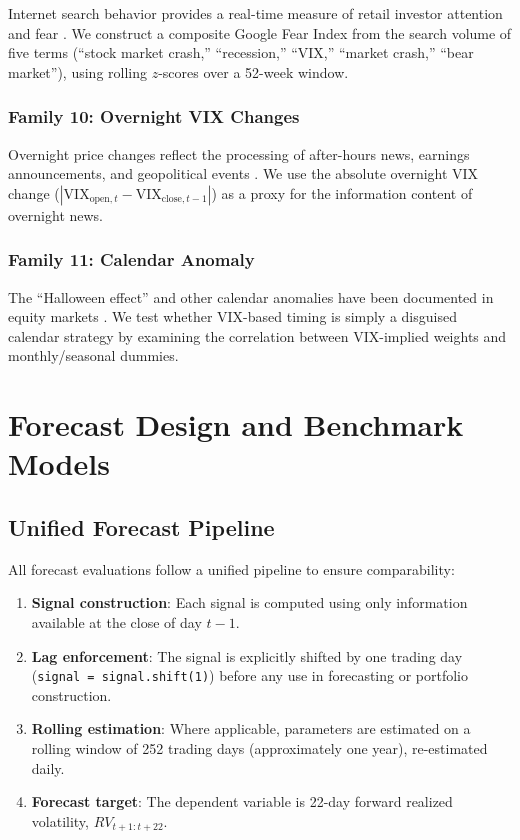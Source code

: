 \documentclass[12pt,a4paper]{article}
\begin{document}
Internet search behavior provides a real-time measure of retail investor attention and fear \citep{da2011, preis2013}. We construct a composite Google Fear Index from the search volume of five terms (``stock market crash,'' ``recession,'' ``VIX,'' ``market crash,'' ``bear market''), using rolling $z$-scores over a 52-week window.

\subsubsection{Family 10: Overnight VIX Changes}

Overnight price changes reflect the processing of after-hours news, earnings announcements, and geopolitical events \citep{lou2019}. We use the absolute overnight VIX change ($|\text{VIX}_{\text{open},t} - \text{VIX}_{\text{close},t-1}|$) as a proxy for the information content of overnight news.

\subsubsection{Family 11: Calendar Anomaly}

The ``Halloween effect'' and other calendar anomalies have been documented in equity markets \citep{bouman2002}. We test whether VIX-based timing is simply a disguised calendar strategy by examining the correlation between VIX-implied weights and monthly/seasonal dummies.


\section{Forecast Design and Benchmark Models}
\label{sec:methodology}

\subsection{Unified Forecast Pipeline}

All forecast evaluations follow a unified pipeline to ensure comparability:

\begin{enumerate}
    \item \textbf{Signal construction}: Each signal is computed using only information available at the close of day $t-1$.
    \item \textbf{Lag enforcement}: The signal is explicitly shifted by one trading day (\texttt{signal = signal.shift(1)}) before any use in forecasting or portfolio construction.
    \item \textbf{Rolling estimation}: Where applicable, parameters are estimated on a rolling window of 252 trading days (approximately one year), re-estimated daily.
    \item \textbf{Forecast target}: The dependent variable is 22-day forward realized volatility, $RV_{t+1:t+22}$.
\end{enumerate}
\end{document}
